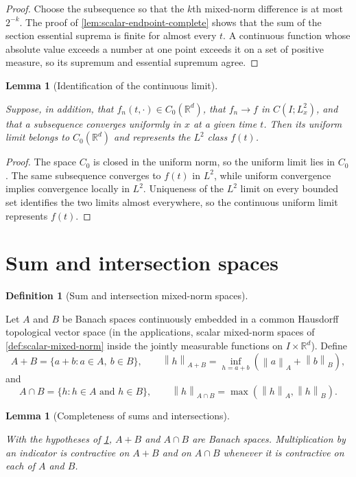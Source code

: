 \documentclass[11pt,oneside]{book}
\providecommand{\uses}[1]{}
\newtheorem{lemma}[theorem]{Lemma}
\theoremstyle{definition}
\newtheorem{definition}[theorem]{Definition}
\theoremstyle{remark}
\newcommand{\R}{\mathbb R}
\newcommand{\1}{\mathbf 1}
\newcommand{\norm}[1]{\left\lVert #1\right\rVert}
\begin{document}
\begin{proof}
\uses{lem:scalar-endpoint-complete}
Choose the subsequence so that the $k$th mixed-norm difference is at most $2^{-k}$. The proof of \cref{lem:scalar-endpoint-complete} shows that the sum of the section essential suprema is finite for almost every $t$. A continuous function whose absolute value exceeds a number at one point exceeds it on a set of positive measure, so its supremum and essential supremum agree.
\end{proof}

\begin{lemma}[Identification of the continuous limit]\label{lem:C0-limit-identification}
\uses{lem:mixed-subsequence-uniform}
Suppose, in addition, that $f_n(t,\cdot)\in C_0(\R^d)$, that $f_n\to f$ in $C(I;L^2_x)$, and that a subsequence converges uniformly in $x$ at a given time $t$. Then its uniform limit belongs to $C_0(\R^d)$ and represents the $L^2$ class $f(t)$.
\end{lemma}

\begin{proof}
\uses{lem:mixed-subsequence-uniform}
The space $C_0$ is closed in the uniform norm, so the uniform limit lies in $C_0$. The same subsequence converges to $f(t)$ in $L^2$, while uniform convergence implies convergence locally in $L^2$. Uniqueness of the $L^2$ limit on every bounded set identifies the two limits almost everywhere, so the continuous uniform limit represents $f(t)$.
\end{proof}

\section{Sum and intersection spaces}

\begin{definition}[Sum and intersection mixed-norm spaces]\label{def:sum-intersection-norm}
\uses{def:scalar-mixed-norm}
Let $A$ and $B$ be Banach spaces continuously embedded in a common Hausdorff topological vector space (in the applications, scalar mixed-norm spaces of \cref{def:scalar-mixed-norm} inside the jointly measurable functions on $I\times\R^d$). Define
\[
 A+B=\{a+b:a\in A,\ b\in B\},\qquad \norm{h}_{A+B}=\inf_{h=a+b}\left(\norm{a}_A+\norm{b}_B\right),
\]
and
\[
 A\cap B=\{h:h\in A\text{ and }h\in B\},\qquad \norm{h}_{A\cap B}=\max\left(\norm{h}_A,\norm{h}_B\right).
\]
\end{definition}

\begin{lemma}[Completeness of sums and intersections]\label{lem:sum-intersection-complete}
\uses{def:sum-intersection-norm}
With the hypotheses of \cref{def:sum-intersection-norm}, $A+B$ and $A\cap B$ are Banach spaces. Multiplication by an indicator is contractive on $A+B$ and on $A\cap B$ whenever it is contractive on each of $A$ and $B$.
\end{lemma}
\end{document}
